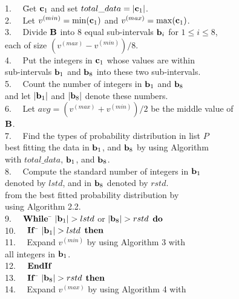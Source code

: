 \documentclass[lettersize,journal]{IEEEtran}
\begin{document}
\begin{tabbing}
1.~~ \= Get ${\bf c}_{1}$ and set $total\_data = |{\bf c}_{1}|$. \\
2.~~ \> Let $v^{(min)} = \min({\bf c}_{1})$ and $v^{(max)} = \max({\bf c}_{1})$. \\
3.~~ \> Divide ${\bf B}$ into 8 equal sub-intervals ${\bf b}_{i}$ for $1 \leq i \leq 8$, \\
     \> each of size $(v^{(max)} - v^{(min)})/8$. \\
4.~~ \> Put the integers in ${\bf c}_{1}$ whose values are within \\
     \> sub-intervals ${\bf b}_{1}$ and ${\bf b}_{8}$ into these two sub-intervals. \\
5.~~ \> Count the number of integers in ${\bf b}_{1}$ and ${\bf b}_{8}$  \\
     \> and let $|{\bf b}_{1}|$ and $|{\bf b}_{8}|$ denote these numbers. \\
6.~~ \> Let $avg = (v^{(max)} + v^{(min)})/2$ be the middle value of \\
     \> ${\bf B}$. \\
7.~~ \> Find the types of probability distribution in list $P$ \\
     \> best fitting the data in ${\bf b}_{1}$, and ${\bf b}_{8}$ by using Algorithm \\
      with $total\_data$, ${\bf b}_{1}$, and ${\bf b}_{8}$. \\
8.~~ \> Compute the standard number of integers in ${\bf b}_{1}$ \\
     \> denoted by $lstd$, and in ${\bf b}_{8}$ denoted by $rstd$. \\
     \> from the best fitted probability distribution by \\
     \> using Algorithm 2.2. \\
9.~~ \> ${\bf While}$ \= $|{\bf b}_{1}| > lstd$ or $|{\bf b}_{8}| > rstd$ ${\bf do}$ \\
10.~~ \>               \> ${\bf If}$ \= $|{\bf b}_{1}| > lstd$ ${\bf then}$ \\
11.~~\>               \>            \> Expand $v^{(min)}$ by using Algorithm 3 with \\
     \>               \>            \> all integers in ${\bf b}_{1}$. \\
12.~~\>               \> ${\bf EndIf}$ \\
13.~~\>               \> ${\bf If}$ \= $|{\bf b}_{8}| > rstd$ ${\bf then}$ \\
14.~~\>               \>            \> Expand $v^{(max)}$ by using Algorithm 4 with \\

\end{tabbing}
\end{document}
